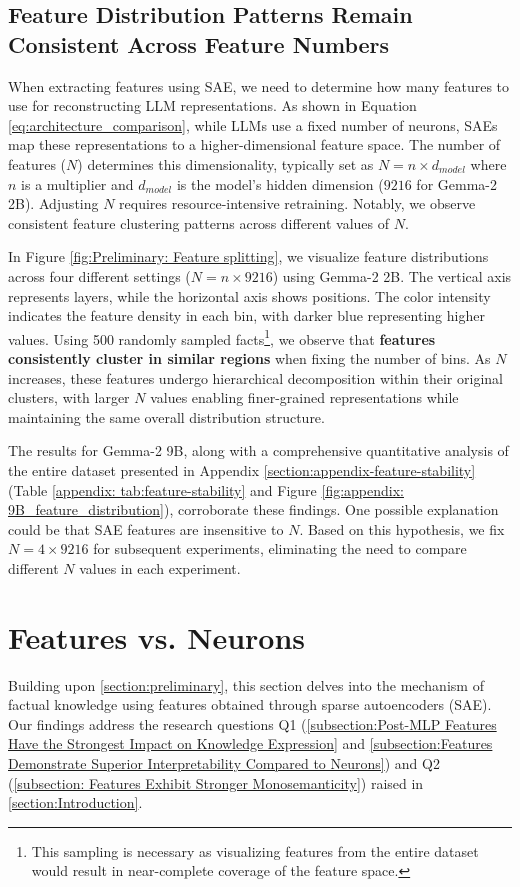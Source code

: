 \subsection{Feature Distribution Patterns Remain Consistent Across Feature Numbers}
When extracting features using SAE, we need to determine how many features to use for reconstructing LLM representations. As shown in Equation \ref{eq:architecture_comparison}, while LLMs use a fixed number of neurons, SAEs map these representations to a higher-dimensional feature space. The number of features ($N$) determines this dimensionality, typically set as $N = n \times d_{model}$ where $n$ is a multiplier and $d_{model}$ is the model's hidden dimension ($9216$ for Gemma-2 2B). Adjusting $N$ requires resource-intensive retraining. Notably, we observe consistent feature clustering patterns across different values of $N$.

In Figure \ref{fig:Preliminary: Feature splitting}, we visualize feature distributions across four different settings ($N = n \times 9216$) using Gemma-2 2B. The vertical axis represents layers, while the horizontal axis shows positions. The color intensity indicates the feature density in each bin, with darker blue representing higher values.  Using 500 randomly sampled facts\footnote{This sampling is necessary as visualizing features from the entire dataset would result in near-complete coverage of the feature space.}, we observe that \textbf{features consistently cluster in similar regions} when fixing the number of bins. As $N$ increases, these features undergo hierarchical decomposition within their original clusters, with larger $N$ values enabling finer-grained representations while maintaining the same overall distribution structure.

The results for Gemma-2 9B, along with a comprehensive quantitative analysis of the entire dataset presented in Appendix \ref{section:appendix-feature-stability} (Table \ref{appendix: tab:feature-stability} and Figure \ref{fig:appendix: 9B_feature_distribution}), corroborate these findings. One possible explanation could be that SAE features are insensitive to $N$. Based on this hypothesis, we fix $N=4 \times 9216$ for subsequent experiments, eliminating the need to compare different $N$ values in each experiment.

\section{Features vs. Neurons}
\label{section:Features vs. Neurons}
Building upon \textsection\ref{section:preliminary}, this section delves into the mechanism of factual knowledge using features obtained through sparse autoencoders (SAE). Our findings address the research questions Q1 (\textsection\ref{subsection:Post-MLP Features Have the Strongest Impact on Knowledge Expression} and \textsection\ref{subsection:Features Demonstrate Superior Interpretability Compared to Neurons}) and Q2 (\textsection\ref{subsection: Features Exhibit Stronger Monosemanticity}) raised in \textsection \ref{section:Introduction}.



